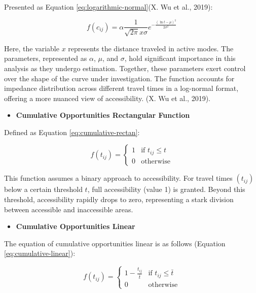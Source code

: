 \documentclass[
11pt, %
oneside, %
english, %
singlespacing, %
]{macthesis} %
\def\tightlist{}
\begin{document}
Presented as Equation \eqref{eq:logarithmic-normal}(X. Wu et al., 2019):

\begin{equation}
f(c_{ij}) = \alpha \frac{1}{\sqrt{2\pi} x \sigma} e^{-\frac{(\ln t - \mu)^2}{2\sigma^2}}
\label{eq:logarithmic-normal}
\end{equation}

Here, the variable \(x\) represents the distance traveled in active modes. The parameters, represented as \(\alpha\), \(\mu\), and \(\sigma\), hold significant importance in this analysis as they undergo estimation. Together, these parameters exert control over the shape of the curve under investigation. The function accounts for impedance distribution across different travel times in a log-normal format, offering a more nuanced view of accessibility. (X. Wu et al., 2019).

\begin{itemize}
\tightlist
\item
  \textbf{Cumulative Opportunities Rectangular Function}
\end{itemize}

Defined as Equation \eqref{eq:cumulative-rectan}:

\begin{equation}
f(t_{ij}) =
\begin{cases}
  1 & \text{if } t_{ij} \le t \\
  0 & \text{otherwise}
\end{cases}
\label{eq:cumulative-rectan}
\end{equation}

This function assumes a binary approach to accessibility. For travel times \((t_{ij})\) below a certain threshold \(t\), full accessibility (value 1) is granted. Beyond this threshold, accessibility rapidly drops to zero, representing a stark division between accessible and inaccessible areas.

\begin{itemize}
\tightlist
\item
  \textbf{Cumulative Opportunities Linear}
\end{itemize}

The equation of cumulative opportunities linear is as follows (Equation \eqref{eq:cumulative-linear}):

\begin{equation}
f(t_{ij}) =
\begin{cases}
  1 - \frac{t_{ij}}{\bar{t}} & \text{if } t_{ij} \le \bar{t} \\
  0 & \text{otherwise}
\end{cases}
\label{eq:cumulative-linear}
\end{equation}
\end{document}
